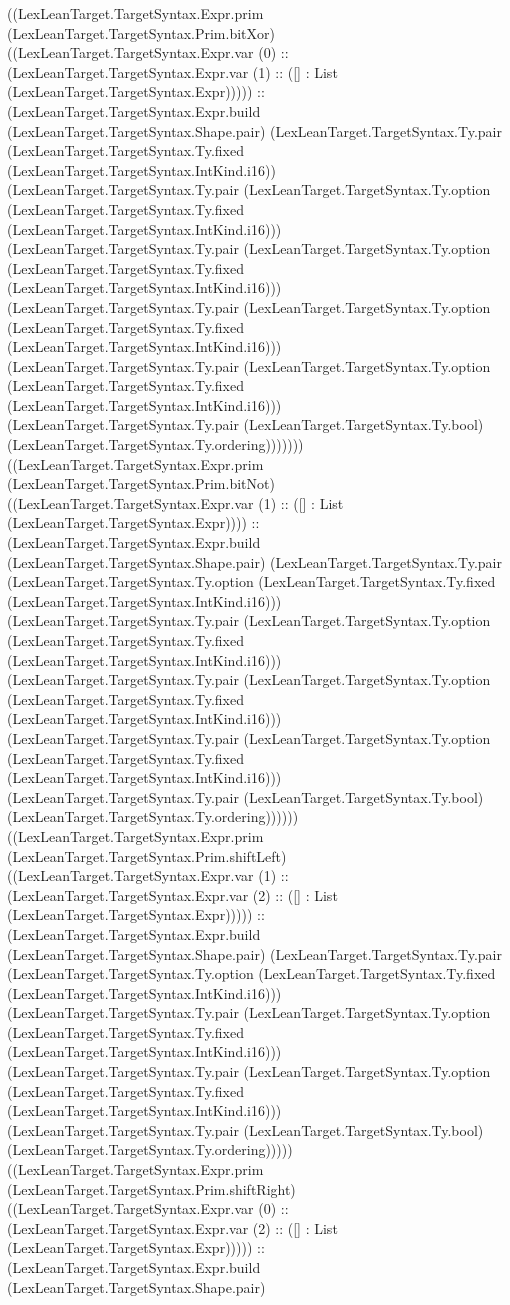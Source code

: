 \documentclass[11pt]{article}
\begin{document}
((LexLeanTarget.TargetSyntax.Expr.prim (LexLeanTarget.TargetSyntax.Prim.bitXor) ((LexLeanTarget.TargetSyntax.Expr.var (0) :: (LexLeanTarget.TargetSyntax.Expr.var (1) :: ([] : List (LexLeanTarget.TargetSyntax.Expr))))) :: (LexLeanTarget.TargetSyntax.Expr.build (LexLeanTarget.TargetSyntax.Shape.pair) (LexLeanTarget.TargetSyntax.Ty.pair (LexLeanTarget.TargetSyntax.Ty.fixed (LexLeanTarget.TargetSyntax.IntKind.i16)) (LexLeanTarget.TargetSyntax.Ty.pair (LexLeanTarget.TargetSyntax.Ty.option (LexLeanTarget.TargetSyntax.Ty.fixed (LexLeanTarget.TargetSyntax.IntKind.i16))) (LexLeanTarget.TargetSyntax.Ty.pair (LexLeanTarget.TargetSyntax.Ty.option (LexLeanTarget.TargetSyntax.Ty.fixed (LexLeanTarget.TargetSyntax.IntKind.i16))) (LexLeanTarget.TargetSyntax.Ty.pair (LexLeanTarget.TargetSyntax.Ty.option (LexLeanTarget.TargetSyntax.Ty.fixed (LexLeanTarget.TargetSyntax.IntKind.i16))) (LexLeanTarget.TargetSyntax.Ty.pair (LexLeanTarget.TargetSyntax.Ty.option (LexLeanTarget.TargetSyntax.Ty.fixed (LexLeanTarget.TargetSyntax.IntKind.i16))) (LexLeanTarget.TargetSyntax.Ty.pair (LexLeanTarget.TargetSyntax.Ty.bool) (LexLeanTarget.TargetSyntax.Ty.ordering))))))) ((LexLeanTarget.TargetSyntax.Expr.prim (LexLeanTarget.TargetSyntax.Prim.bitNot) ((LexLeanTarget.TargetSyntax.Expr.var (1) :: ([] : List (LexLeanTarget.TargetSyntax.Expr)))) :: (LexLeanTarget.TargetSyntax.Expr.build (LexLeanTarget.TargetSyntax.Shape.pair) (LexLeanTarget.TargetSyntax.Ty.pair (LexLeanTarget.TargetSyntax.Ty.option (LexLeanTarget.TargetSyntax.Ty.fixed (LexLeanTarget.TargetSyntax.IntKind.i16))) (LexLeanTarget.TargetSyntax.Ty.pair (LexLeanTarget.TargetSyntax.Ty.option (LexLeanTarget.TargetSyntax.Ty.fixed (LexLeanTarget.TargetSyntax.IntKind.i16))) (LexLeanTarget.TargetSyntax.Ty.pair (LexLeanTarget.TargetSyntax.Ty.option (LexLeanTarget.TargetSyntax.Ty.fixed (LexLeanTarget.TargetSyntax.IntKind.i16))) (LexLeanTarget.TargetSyntax.Ty.pair (LexLeanTarget.TargetSyntax.Ty.option (LexLeanTarget.TargetSyntax.Ty.fixed (LexLeanTarget.TargetSyntax.IntKind.i16))) (LexLeanTarget.TargetSyntax.Ty.pair (LexLeanTarget.TargetSyntax.Ty.bool) (LexLeanTarget.TargetSyntax.Ty.ordering)))))) ((LexLeanTarget.TargetSyntax.Expr.prim (LexLeanTarget.TargetSyntax.Prim.shiftLeft) ((LexLeanTarget.TargetSyntax.Expr.var (1) :: (LexLeanTarget.TargetSyntax.Expr.var (2) :: ([] : List (LexLeanTarget.TargetSyntax.Expr))))) :: (LexLeanTarget.TargetSyntax.Expr.build (LexLeanTarget.TargetSyntax.Shape.pair) (LexLeanTarget.TargetSyntax.Ty.pair (LexLeanTarget.TargetSyntax.Ty.option (LexLeanTarget.TargetSyntax.Ty.fixed (LexLeanTarget.TargetSyntax.IntKind.i16))) (LexLeanTarget.TargetSyntax.Ty.pair (LexLeanTarget.TargetSyntax.Ty.option (LexLeanTarget.TargetSyntax.Ty.fixed (LexLeanTarget.TargetSyntax.IntKind.i16))) (LexLeanTarget.TargetSyntax.Ty.pair (LexLeanTarget.TargetSyntax.Ty.option (LexLeanTarget.TargetSyntax.Ty.fixed (LexLeanTarget.TargetSyntax.IntKind.i16))) (LexLeanTarget.TargetSyntax.Ty.pair (LexLeanTarget.TargetSyntax.Ty.bool) (LexLeanTarget.TargetSyntax.Ty.ordering))))) ((LexLeanTarget.TargetSyntax.Expr.prim (LexLeanTarget.TargetSyntax.Prim.shiftRight) ((LexLeanTarget.TargetSyntax.Expr.var (0) :: (LexLeanTarget.TargetSyntax.Expr.var (2) :: ([] : List (LexLeanTarget.TargetSyntax.Expr))))) :: (LexLeanTarget.TargetSyntax.Expr.build (LexLeanTarget.TargetSyntax.Shape.pair) 
\end{document}
